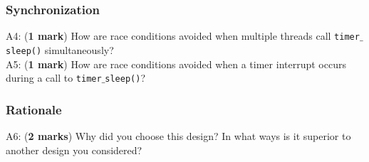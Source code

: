 \documentclass[a4paper,12pt]{article}
\begin{document}
\subsubsection*{Synchronization}
A4: ({\bf 1 mark}) How are race conditions avoided when multiple threads call \texttt{timer$\_$sleep()} simultaneously? \\ 
A5: ({\bf 1 mark}) How are race conditions avoided when a timer interrupt occurs during a call to \texttt{timer$\_$sleep()}?

\subsubsection*{Rationale}
A6: ({\bf 2 marks}) Why did you choose this design?  
In what ways is it superior to another design you considered?
\end{document}

